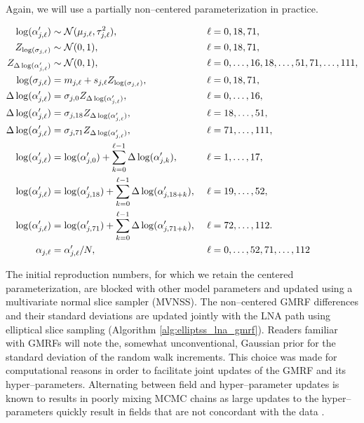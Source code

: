 Again, we will use a partially non--centered parameterization in practice.
\begin{small}
	\begin{align}
	\log(\alpha^\prime_{j,\ell}) &\sim \mcN(\mu_{j,\ell},\tau_{j,\ell}^2),&\ &\ell= 0,18,71, \nonumber\\
	Z_{\log(\sigma_{j,\ell})} &\sim \mcN(0,1),&\ &\ell=0,18,71, \nonumber \\
	Z_{\Delta\log(\alpha^\prime_{j,\ell})} &\sim \mcN(0,1),&\ &\ell=0,\dots,16,18,\dots,51,71,\dots,111, \nonumber \\ 
	\log(\sigma_{j,\ell}) &= m_{j,\ell} + s_{j,\ell}Z_{\log(\sigma_{j,\ell})},&\ &\ell = 0,18,71,\nonumber\\
	\Delta\log(\alpha^\prime_{j,\ell})&= \sigma_{j,0} Z_{\Delta\log(\alpha^\prime_{j,\ell})},&\ &\ell=0,\dots,16, \nonumber\\
	\Delta\log(\alpha^\prime_{j,\ell})&= \sigma_{j,18} Z_{\Delta\log(\alpha^\prime_{j,\ell})},&\ &\ell=18,\dots,51, \nonumber\\
	\Delta\log(\alpha^\prime_{j,\ell})&= \sigma_{j,71} Z_{\Delta\log(\alpha^\prime_{j,\ell})},&\ &\ell=71,\dots,111, \nonumber\\
	\log(\alpha^\prime_{j,\ell}) &= \log(\alpha^\prime_{j,0}) + \sum_{k=0}^{\ell-1}\Delta\log(\alpha^\prime_{j,k}),&\ &\ell = 1,\dots,17, \nonumber\\
	\log(\alpha^\prime_{j,\ell}) &= \log(\alpha^\prime_{j,18}) + \sum_{k=0}^{\ell-1}\Delta\log(\alpha^\prime_{j,18+k}),&\ &\ell = 19,\dots,52, \nonumber\\
	\log(\alpha^\prime_{j,\ell}) &= \log(\alpha^\prime_{j,71}) + \sum_{k=0}^{\ell-1}\Delta\log(\alpha^\prime_{j,71+k}),&\ &\ell = 72,\dots,112. \nonumber \\
	\alpha_{j,\ell} &= \alpha^\prime_{j,\ell}/N,&\ &\ell=0,\dots,52,71,\dots,112 \nonumber
	\end{align}
\end{small}

The initial reproduction numbers, for which we retain the centered parameterization, are blocked with other model parameters and updated using a multivariate normal slice sampler (MVNSS). The non--centered GMRF differences and their standard deviations are updated jointly with the LNA path using elliptical slice sampling (Algorithm \ref{alg:elliptss_lna_gmrf}). Readers familiar with GMRFs will note the, somewhat unconventional, Gaussian prior for the standard deviation of the random walk increments. This choice was made for computational reasons in order to facilitate joint updates of the GMRF and its hyper--parameters. Alternating between field and hyper--parameter updates is known to results in poorly mixing MCMC chains as large updates to the hyper--parameters quickly result in fields that are not concordant with the data  \cite{knorr2002block,murray2010hyper}. 

